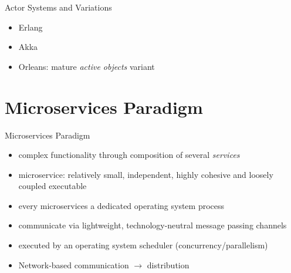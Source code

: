 \documentclass{beamer}
\begin{document}

\begin{frame}{Actor Systems and Variations}

\begin{itemize}
  \item Erlang
  \item Akka
  \item Orleans: mature \textit{active objects} variant
\end{itemize}
  

\end{frame}


\section{Microservices Paradigm}


\begin{frame}{Microservices Paradigm}

\begin{itemize}
  \item complex functionality through composition of several \textit{services}
  \item microservice: relatively small, independent, highly cohesive and loosely coupled executable
  \item every microservices a dedicated operating system process
  \item communicate via lightweight, technology-neutral message passing channels
  \item executed by an operating system scheduler (concurrency/parallelism)
  \item Network-based communication $\rightarrow$ distribution
\end{itemize}

\end{frame}

\end{document}

